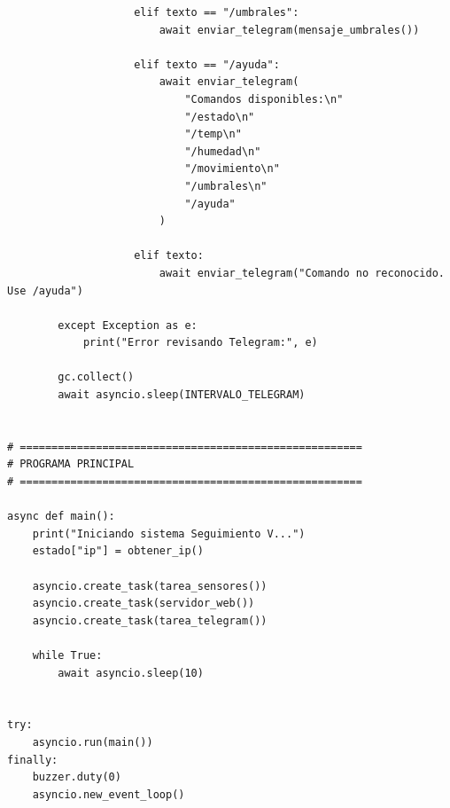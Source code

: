 \documentclass[12pt]{article}
\begin{document}
\begin{lstlisting}
                    elif texto == "/umbrales":
                        await enviar_telegram(mensaje_umbrales())

                    elif texto == "/ayuda":
                        await enviar_telegram(
                            "Comandos disponibles:\n"
                            "/estado\n"
                            "/temp\n"
                            "/humedad\n"
                            "/movimiento\n"
                            "/umbrales\n"
                            "/ayuda"
                        )

                    elif texto:
                        await enviar_telegram("Comando no reconocido. Use /ayuda")

        except Exception as e:
            print("Error revisando Telegram:", e)

        gc.collect()
        await asyncio.sleep(INTERVALO_TELEGRAM)


# ======================================================
# PROGRAMA PRINCIPAL
# ======================================================

async def main():
    print("Iniciando sistema Seguimiento V...")
    estado["ip"] = obtener_ip()

    asyncio.create_task(tarea_sensores())
    asyncio.create_task(servidor_web())
    asyncio.create_task(tarea_telegram())

    while True:
        await asyncio.sleep(10)


try:
    asyncio.run(main())
finally:
    buzzer.duty(0)
    asyncio.new_event_loop()
\end{lstlisting}
\end{document}
